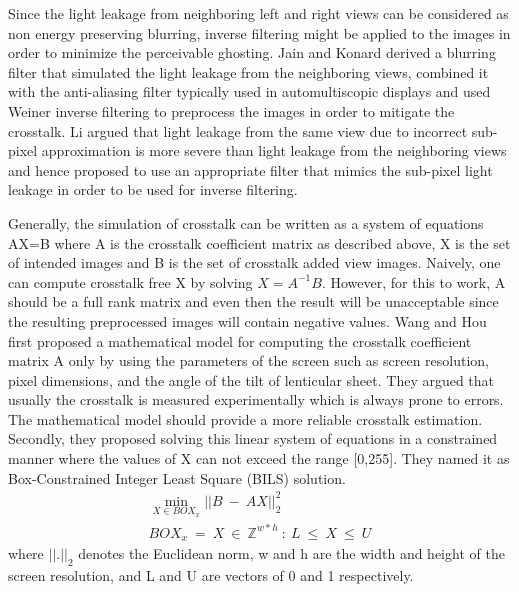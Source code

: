 Since the light leakage from neighboring left and right views can be considered as non energy preserving blurring, inverse filtering might be applied to the images in order to minimize the perceivable ghosting. Jain and Konard \cite{jain2007crosstalk} derived a blurring filter that simulated the light leakage from the neighboring views, combined it with the anti-aliasing filter typically used in automultiscopic displays and used Weiner inverse filtering to preprocess the images in order to mitigate the crosstalk. Li \cite{citation-0} argued that light leakage from the same view due to incorrect sub-pixel approximation is more severe than light leakage from the neighboring views and hence proposed to use an appropriate filter that mimics the sub-pixel light leakage in order to be used for inverse filtering.

Generally, the simulation of crosstalk can be written as a system of equations AX=B where A is the crosstalk coefficient matrix as described above, X is the set of intended images and B is the set of crosstalk added view images. Naively, one can compute crosstalk free X by solving $X=A^{-1}B$. However, for this to work, A should be a full rank matrix and even then the result will be unacceptable since the resulting preprocessed images will contain negative values. Wang and Hou \cite{wang2014improved} first proposed a mathematical model for computing the crosstalk coefficient matrix A only by using the parameters of the screen such as screen resolution, pixel dimensions, and the angle of the tilt of lenticular sheet. They argued that usually the crosstalk is measured experimentally which is always prone to errors. The mathematical model should provide a more reliable crosstalk estimation. Secondly, they proposed solving this linear system of equations in a constrained manner where the values of X can not exceed the range [0,255]. They named it as Box-Constrained Integer Least Square (BILS) solution.
\begin{equation}
\begin{aligned}
\underset{X \in BOX_x}{\operatorname{min}}||B\: -\: AX||_2^2 \\
BOX_x\: = \: {X\: \in \: \mathbb{Z}^{w*h} \: : \: L\: \leq \: X\: \leq\: U }
\end{aligned}
\label{eq:bils}
\end{equation}
where $||.||_2$ denotes the Euclidean norm, w and h are the width and height of the screen resolution, and L and U are vectors of 0 and 1 respectively.